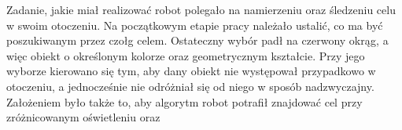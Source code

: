 Zadanie, jakie miał realizować robot polegało na namierzeniu oraz śledzeniu celu w swoim otoczeniu. Na początkowym etapie pracy należało ustalić, co ma być poszukiwanym przez czołg celem. Ostateczny wybór padł na czerwony okrąg, a więc obiekt o określonym kolorze oraz geometrycznym kształcie. Przy jego wyborze kierowano się tym, aby dany obiekt nie występował przypadkowo w otoczeniu, a jednocześnie nie odróżniał się od niego w sposób nadzwyczajny. Założeniem było także to, aby algorytm robot potrafił znajdować cel przy zróżnicowanym oświetleniu oraz 